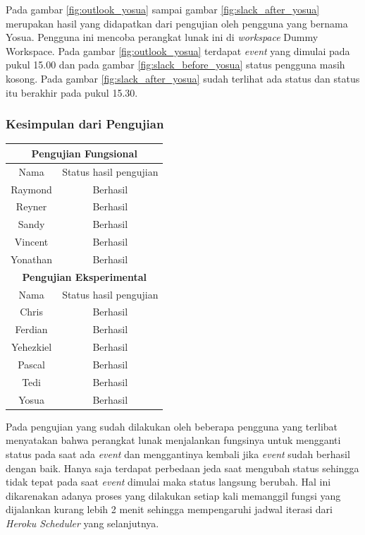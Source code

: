Pada gambar \ref{fig:outlook_yosua} sampai gambar \ref{fig:slack_after_yosua} merupakan hasil yang didapatkan dari pengujian oleh pengguna yang bernama Yosua. Pengguna ini mencoba perangkat lunak ini di \textit{workspace} Dummy Workspace. Pada gambar \ref{fig:outlook_yosua} terdapat \textit{event} yang dimulai pada pukul 15.00 dan pada gambar \ref{fig:slack_before_yosua} status pengguna masih kosong. Pada gambar \ref{fig:slack_after_yosua} sudah terlihat ada status dan status itu berakhir pada pukul 15.30. 
\clearpage

\subsubsection{Kesimpulan dari Pengujian}

\begin{center}
\begin{tabular}{ |c|c| }
\toprule
 \multicolumn{2}{|c|}{\textbf{Pengujian Fungsional}} \\ 
 \hline
 Nama & Status hasil pengujian  \\
 \hline
 Raymond & Berhasil \\  
 Reyner & Berhasil \\  
 Sandy & Berhasil \\  
 Vincent & Berhasil \\  
 Yonathan & Berhasil \\
 \multicolumn{2}{|c|}{\textbf{Pengujian Eksperimental}} \\
 \hline
 Nama & Status hasil pengujian  \\  
 \hline
 Chris & Berhasil \\  
 Ferdian & Berhasil \\  
 Yehezkiel & Berhasil \\  
 Pascal & Berhasil \\  
 Tedi & Berhasil \\  
 Yosua & Berhasil \\
 \bottomrule
\end{tabular}
\end{center}

Pada pengujian yang sudah dilakukan oleh beberapa pengguna yang terlibat menyatakan bahwa perangkat lunak menjalankan fungsinya untuk mengganti status pada saat ada \textit{event} dan menggantinya kembali jika \textit{event} sudah berhasil dengan baik. Hanya saja terdapat perbedaan jeda saat mengubah status sehingga tidak tepat pada saat \textit{event} dimulai maka status langsung berubah. Hal ini dikarenakan adanya proses yang dilakukan setiap kali memanggil fungsi yang dijalankan kurang lebih 2 menit sehingga mempengaruhi jadwal iterasi dari \textit{Heroku Scheduler} yang selanjutnya. 